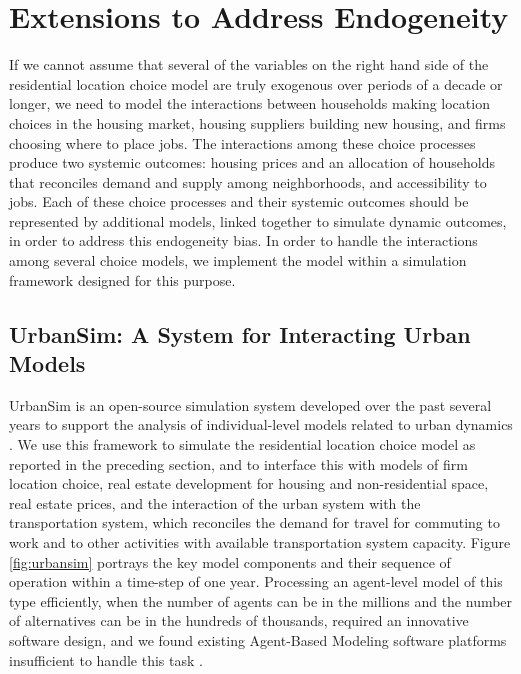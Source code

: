 \documentclass[12pt,a4paper]{article}
\begin{document}
\section{Extensions to Address Endogeneity}

If we cannot assume that several of the variables on the right hand
side of the residential location choice model are truly exogenous
over periods of a decade or longer, we need to model the
interactions between households making location choices in the
housing market, housing suppliers building new housing, and firms
choosing where to place jobs.  The interactions among these choice
processes produce two systemic outcomes: housing prices and an
allocation of households that reconciles demand and supply among
neighborhoods, and accessibility to jobs. Each of these choice
processes and their systemic outcomes should be represented by
additional models, linked together to simulate dynamic outcomes, in
order to address this endogeneity bias.  In order to handle the
interactions among several choice models, we implement the model
within a simulation framework designed for this purpose.

\subsection{UrbanSim: A System for Interacting Urban Models}

UrbanSim is an open-source simulation system developed over the
past several years to support the analysis of individual-level
models related to urban dynamics
\cite{waddell-japa-2002,waddell-nse-2003}. We use this framework
to simulate the residential location choice model as reported in
the preceding section, and to interface this with models of firm
location choice, real estate development for housing and
non-residential space, real estate prices, and the interaction of
the urban system with the transportation system, which reconciles
the demand for travel for commuting to work and to other
activities with available transportation system capacity. Figure
\ref{fig:urbansim} portrays the key model components and their
sequence of operation within a time-step of one year. Processing
an agent-level model of this type efficiently, when the number of
agents can be in the millions and the number of alternatives can
be in the hundreds of thousands, required an innovative software
design, and we found existing Agent-Based Modeling software
platforms insufficient to handle this task \cite{noth-ceus-2003}.
\end{document}
